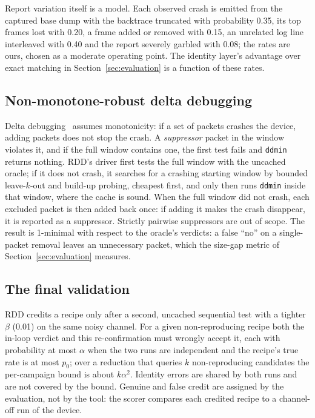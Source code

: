 Report variation itself is a model. Each observed crash is emitted from the
captured base dump with the backtrace truncated with probability 0.35, its top
frames lost with 0.20, a frame added or removed with 0.15, an unrelated log line
interleaved with 0.40 and the report severely garbled with 0.08; the rates are
ours, chosen as a moderate operating point. The identity layer's advantage over
exact matching in Section~\ref{sec:evaluation} is a function of these rates.

\subsection{Non-monotone-robust delta debugging}

Delta debugging~\cite{ddmin2002} assumes monotonicity: if a set of packets crashes
the device, adding packets does not stop the crash. A \emph{suppressor}
packet in the window violates it, and if the full window contains one, the first
test fails and \texttt{ddmin} returns nothing. RDD's driver first tests the full
window with the uncached oracle; if it does not crash, it searches for a crashing
starting window by bounded leave-$k$-out and build-up probing, cheapest first,
and only then runs \texttt{ddmin} inside that window, where the cache is sound.
When the full window did not crash, each excluded packet is then added back once: if adding it makes the crash
disappear, it is reported as a suppressor. Strictly pairwise suppressors are out of
scope. The result is 1-minimal with respect to the oracle's verdicts: a false
``no'' on a single-packet removal leaves an unnecessary packet, which the size-gap
metric of Section~\ref{sec:evaluation} measures.

\subsection{The final validation}

RDD credits a recipe only after a second, uncached sequential test with a tighter $\beta$ (0.01) on the same noisy channel. For a given non-reproducing recipe both the
in-loop verdict and this re-confirmation must wrongly accept it, each with
probability at most $\alpha$ when the two runs are independent and the recipe's
true rate is at most $p_0$; over a reduction that queries $k$ non-reproducing
candidates the per-campaign bound is about $k\alpha^2$. Identity errors are shared
by both runs and are not covered by the bound. Genuine and false credit are
assigned by the evaluation, not by the tool: the scorer compares each credited
recipe to a channel-off run of the device.

